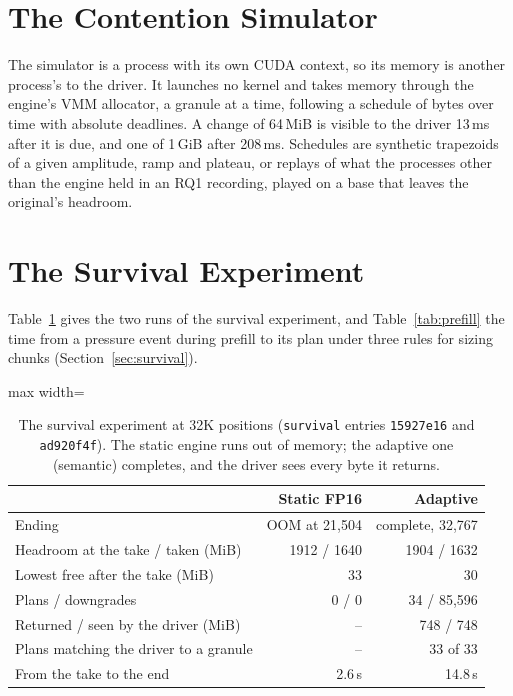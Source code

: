 \documentclass{article}
\begin{document}
\section{The Contention Simulator}
\label{app:simulator}

The simulator is a process with its own CUDA context, so its memory is another
process's to the driver. It launches no kernel and takes memory through the
engine's VMM allocator, a granule at a time, following a schedule of bytes over
time with absolute deadlines. A change of 64\,MiB is visible to the driver
13\,ms after it is due, and one of 1\,GiB after 208\,ms. Schedules are
synthetic trapezoids of a given amplitude, ramp and plateau, or replays of what
the processes other than the engine held in an RQ1 recording, played on a base
that leaves the original's headroom.

\section{The Survival Experiment}
\label{app:survival}

Table~\ref{tab:survival} gives the two runs of the survival experiment, and
Table~\ref{tab:prefill} the time from a pressure event during prefill to its plan
under three rules for sizing chunks (Section~\ref{sec:survival}).

\begin{table}[!ht]
\caption{The survival experiment at 32K positions (\texttt{survival} entries
\texttt{15927e16} and \texttt{ad920f4f}). The static engine runs out of memory;
the adaptive one (semantic) completes, and the driver sees every byte it
returns.}
\label{tab:survival}
\centering
\small
\begin{adjustbox}{max width=\columnwidth}
\begin{tabular}{lrr}
\toprule
& Static FP16 & Adaptive \\
\midrule
Ending & OOM at 21{,}504 & complete, 32{,}767 \\
Headroom at the take / taken (MiB) & 1912 / 1640 & 1904 / 1632 \\
Lowest free after the take (MiB) & 33 & 30 \\
Plans / downgrades & 0 / 0 & 34 / 85{,}596 \\
Returned / seen by the driver (MiB) & -- & 748 / 748 \\
Plans matching the driver to a granule & -- & 33 of 33 \\
From the take to the end & 2.6\,s & 14.8\,s \\
\bottomrule
\end{tabular}
\end{adjustbox}
\end{table}
\end{document}
